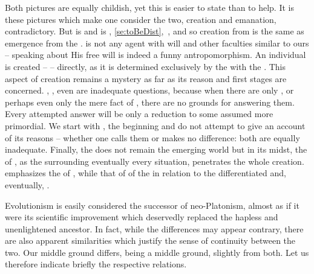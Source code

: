 Both pictures are equally childish, yet this is easier to state than to help. It
is these pictures which make one consider the two, creation and emanation,
contradictory. But  is  and  is ,
\ref{se:toBeDist},~, and so creation from  is the
same as emergence from the .  is not any agent with will and
other faculties similar to ours -- speaking about His free will is indeed a
funny antropomorphism. An individual  is created --  --
directly, as it is determined exclusively by the  with the
. This aspect of creation remains a mystery as far as its reason and
first stages are concerned. , , even  are inadequate
questions, because when there are only , or perhaps even
only the mere fact of , there are no grounds for answering
them. Every attempted answer will be only a reduction to some 
assumed more primordial. We start with , the  beginning
and do not attempt to give an account of its reasons -- whether one calls them
 or  makes no difference: both
are equally inadequate.  Finally, the  does not remain 
the emerging world but in its midst, the  of , as the
 surrounding eventually every situation, penetrates the whole
creation.   emphasizes the  of , while
 that of  of the  in relation to the
differentiated and, eventually, .


\label{se:neoplatonism} Evolutionism is
easily considered the successor of neo-Platonism, almost as if it were its
scientific improvement which deservedly replaced the hapless and unenlightened
ancestor. In fact, while the differences may appear contrary, there are also
apparent similarities which justify the sense of continuity between the two.
Our middle ground differs, being a middle ground, slightly from both. Let us
therefore indicate briefly the respective relations.

